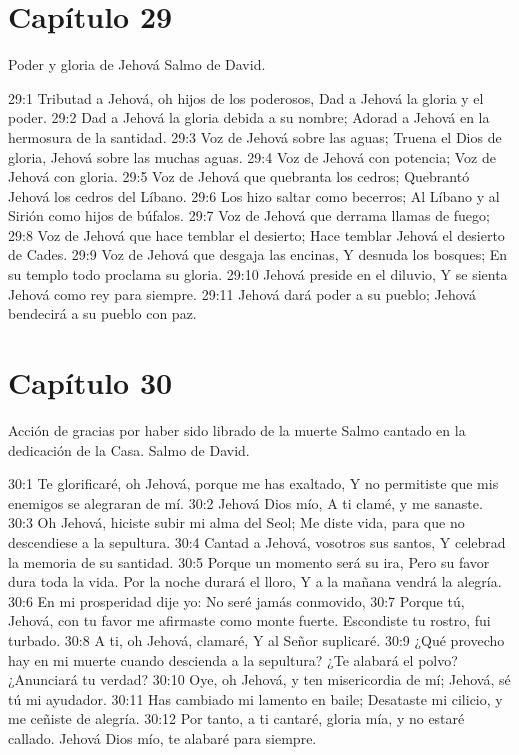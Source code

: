 \section*{Capítulo 29}
Poder y gloria de Jehová 
Salmo de David. 

29:1 Tributad a Jehová, oh hijos de los poderosos, 
Dad a Jehová la gloria y el poder. 
29:2 Dad a Jehová la gloria debida a su nombre; 
Adorad a Jehová en la hermosura de la santidad. 
29:3 Voz de Jehová sobre las aguas; 
Truena el Dios de gloria, 
Jehová sobre las muchas aguas. 
29:4 Voz de Jehová con potencia; 
Voz de Jehová con gloria. 
29:5 Voz de Jehová que quebranta los cedros; 
Quebrantó Jehová los cedros del Líbano. 
29:6 Los hizo saltar como becerros; 
Al Líbano y al Sirión como hijos de búfalos. 
29:7 Voz de Jehová que derrama llamas de fuego; 
29:8 Voz de Jehová que hace temblar el desierto; 
Hace temblar Jehová el desierto de Cades. 
29:9 Voz de Jehová que desgaja las encinas, 
Y desnuda los bosques; 
En su templo todo proclama su gloria. 
29:10 Jehová preside en el diluvio, 
Y se sienta Jehová como rey para siempre. 
29:11 Jehová dará poder a su pueblo; 
Jehová bendecirá a su pueblo con paz. 
\section*{Capítulo 30}
Acción de gracias por haber sido librado de la muerte 
Salmo cantado en la dedicación de la Casa. 
Salmo de David. 

30:1 Te glorificaré, oh Jehová, porque me has exaltado, 
Y no permitiste que mis enemigos se alegraran de mí. 
30:2 Jehová Dios mío, 
A ti clamé, y me sanaste. 
30:3 Oh Jehová, hiciste subir mi alma del Seol; 
Me diste vida, para que no descendiese a la sepultura. 
30:4 Cantad a Jehová, vosotros sus santos, 
Y celebrad la memoria de su santidad. 
30:5 Porque un momento será su ira, 
Pero su favor dura toda la vida. 
Por la noche durará el lloro, 
Y a la mañana vendrá la alegría. 
30:6 En mi prosperidad dije yo: 
No seré jamás conmovido, 
30:7 Porque tú, Jehová, con tu favor me afirmaste como monte fuerte. 
Escondiste tu rostro, fui turbado. 
30:8 A ti, oh Jehová, clamaré, 
Y al Señor suplicaré. 
30:9 ¿Qué provecho hay en mi muerte cuando descienda a la sepultura? 
¿Te alabará el polvo? ¿Anunciará tu verdad? 
30:10 Oye, oh Jehová, y ten misericordia de mí; 
Jehová, sé tú mi ayudador. 
30:11 Has cambiado mi lamento en baile; 
Desataste mi cilicio, y me ceñiste de alegría. 
30:12 Por tanto, a ti cantaré, gloria mía, y no estaré callado. 
Jehová Dios mío, te alabaré para siempre. 
